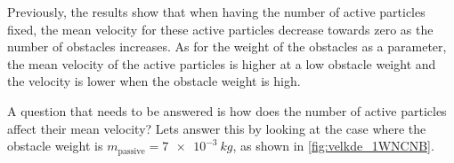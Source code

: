 

Previously, the results show that when having the number of active particles fixed, 
the mean velocity for these active particles decrease towards zero as the number of 
obstacles increases. As for the weight of the obstacles as a parameter, 
the mean velocity of the active particles is higher at a low obstacle weight 
and the velocity is lower when the obstacle weight is high. 

A question that needs to be answered is how does the number of active particles 
affect their mean velocity? Lets answer this by looking at the case where 
the obstacle weight is $m_{\text{passive}}=\SI{7e-3}{kg}$, as shown in \cref{fig:velkde_1WNCNB}.


